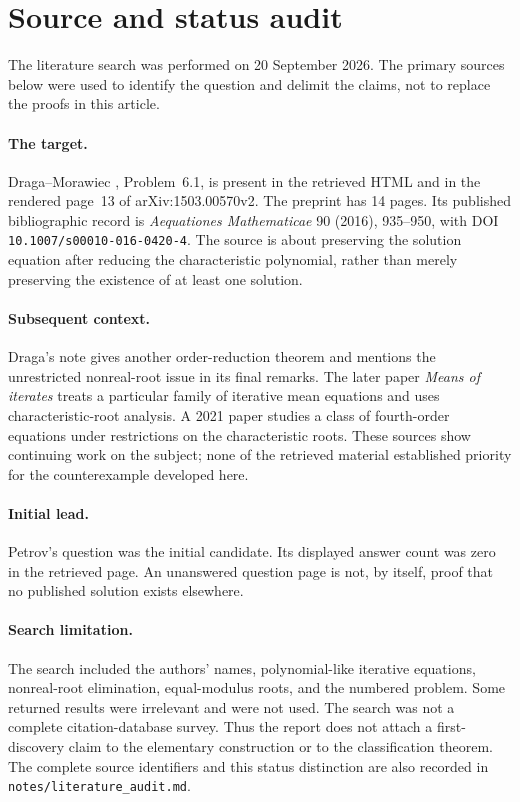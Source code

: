 \documentclass[11pt,letterpaper]{article}
\theoremstyle{definition}
\theoremstyle{remark}
\begin{document}
\appendix
\section{Source and status audit}
\label{app:sources}

The literature search was performed on 20 September 2026. The primary
sources below were used to identify the question and delimit the claims,
not to replace the proofs in this article.

\paragraph{The target.}
Draga--Morawiec \cite{DM2016}, Problem~6.1, is present in the retrieved
HTML and in the rendered page~13 of arXiv:1503.00570v2. The preprint has
14 pages. Its published bibliographic record is
\emph{Aequationes Mathematicae} 90 (2016), 935--950, with DOI
\texttt{10.1007/s00010-016-0420-4}. The source is about preserving the
solution equation after reducing the characteristic polynomial, rather
than merely preserving the existence of at least one solution.

\paragraph{Subsequent context.}
Draga's note \cite{D2016} gives another order-reduction theorem and
mentions the unrestricted nonreal-root issue in its final remarks.
The later paper \emph{Means of iterates} \cite{DM2018} treats a particular
family of iterative mean equations and uses characteristic-root
analysis. A 2021 paper \cite{TLM2021} studies a class of fourth-order
equations under restrictions on the characteristic roots. These sources
show continuing work on the subject; none of the retrieved material
established priority for the counterexample developed here.

\paragraph{Initial lead.}
Petrov's question \cite{Petrov2016} was the initial candidate. Its displayed
answer count was zero in the retrieved page. An unanswered question page
is not, by itself, proof that no published solution exists elsewhere.

\paragraph{Search limitation.}
The search included the authors' names, polynomial-like iterative
equations, nonreal-root elimination, equal-modulus roots, and the numbered
problem. Some returned results were irrelevant and were not used. The
search was not a complete citation-database survey. Thus the report does
not attach a first-discovery claim to the elementary construction or to
the classification theorem. The complete source identifiers and this
status distinction are also recorded in
\texttt{notes/literature\_audit.md}.
\end{document}
